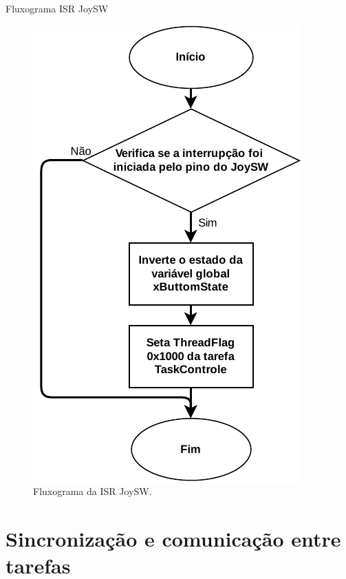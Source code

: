 \documentclass{if-beamer}
\begin{document}
\begin{frame}{Fluxograma ISR JoySW}



\begin{figure}[H]
	\centering
	\includegraphics[width=0.29\linewidth]{img/fluxograma_joysw}
	\caption{Fluxograma da ISR JoySW.}
	\label{fig:fluxograma_joysw}
\end{figure}

\end{frame}



\section{Sincronização e comunicação entre tarefas}
\end{document}
